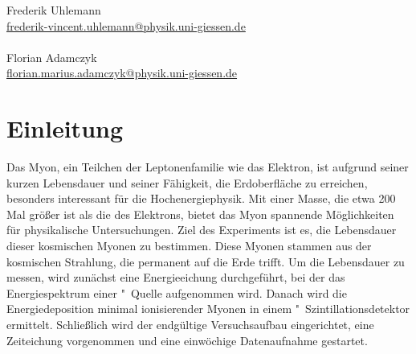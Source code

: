 \documentclass[12pt,a4paper,ngerman]{report}
\begin{document}
\begin{titlepage}
\begin{minipage}{0.49\textwidth}
\begin{flushright}
				\large{Frederik Uhlemann}\\
				\small{\href{mailto:frederik-vincent.uhlemann@physik.uni-giessen.de}{frederik-vincent.uhlemann@physik.uni-giessen.de}\\~\\
				}
				\large{Florian Adamczyk} \\
				\small{\href{mailto:florian.marius.adamczyk@physik.uni-giessen.de}{florian.marius.adamczyk@physik.uni-giessen.de}\\
			}
		\end{flushright}
	\end{minipage}
	
	\end{titlepage}
	
\setcounter{secnumdepth}{3}
\setcounter{tocdepth}{4}
\tableofcontents


	
\chapter*{Einleitung}
	Das Myon, ein Teilchen der Leptonenfamilie wie das Elektron, ist aufgrund seiner kurzen Lebensdauer und seiner Fähigkeit, die Erdoberfläche zu erreichen, besonders interessant für die Hochenergiephysik. Mit einer Masse, die etwa \num{200} Mal größer ist als die des Elektrons, bietet das Myon spannende Möglichkeiten für physikalische Untersuchungen. Ziel des Experiments ist es, die Lebensdauer dieser kosmischen Myonen zu bestimmen. Diese Myonen stammen aus der kosmischen Strahlung, die permanent auf die Erde trifft. Um die Lebensdauer zu messen, wird zunächst eine Energieeichung durchgeführt, bei der das Energiespektrum einer "~Quelle aufgenommen wird. Danach wird die Energiedeposition minimal ionisierender Myonen in einem "~Szintillationsdetektor ermittelt. Schließlich wird der endgültige Versuchsaufbau eingerichtet, eine Zeiteichung vorgenommen und eine einwöchige Datenaufnahme gestartet.
\end{document}
